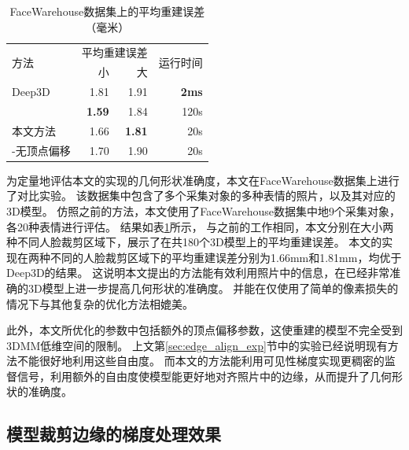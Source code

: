\begin{table}
    \caption[FaceWarehouse数据集上的平均重建误差]{FaceWarehouse数据集上的平均重建误差（毫米）}
    \label{tab:facewarehouse}
    \centering
    \begin{tabular}{l|rrr}
        \toprule
        \multirow{2}{*}{方法} & \multicolumn{2}{c}{平均重建误差} & \multirow{2}{*}{运行时间} \\
        \cmidrule{2-3}
        & 小 & 大 \\
        \midrule
        Deep3D\citep{deep3d} & 1.81 & 1.91 & \textbf{2ms} \\
        \citet{GZCVVPT16} & \textbf{1.59} & 1.84 & 120s \\
        本文方法 & 1.66 & \textbf{1.81} & 20s \\
        \hspace{2ex} -无顶点偏移 & 1.70 & 1.90 & 20s \\
        \bottomrule
    \end{tabular}
\end{table}
为定量地评估本文的实现的几何形状准确度，本文在FaceWarehouse\citep{FaceWarehouse}数据集上进行了对比实验。
该数据集中包含了多个采集对象的多种表情的照片，以及其对应的3D模型。
仿照之前的方法，本文使用了FaceWarehouse数据集中地9个采集对象，各20种表情进行评估。
结果如表\ref{tab:facewarehouse}所示，
与之前的工作相同，本文分别在大小两种不同人脸裁剪区域下，展示了在共180个3D模型上的平均重建误差。
本文的实现在两种不同的人脸裁剪区域下的平均重建误差分别为1.66mm和1.81mm，均优于Deep3D的结果。
这说明本文提出的方法能有效利用照片中的信息，在已经非常准确的3D模型上进一步提高几何形状的准确度。
并能在仅使用了简单的像素损失的情况下与其他复杂的优化方法\citep{GZCVVPT16}相媲美。

此外，本文所优化的参数中包括额外的顶点偏移参数，这使重建的模型不完全受到3DMM低维空间的限制。
上文第\ref{sec:edge_align_exp}节中的实验已经说明现有方法不能很好地利用这些自由度。
而本文的方法能利用可见性梯度实现更稠密的监督信号，利用额外的自由度使模型能更好地对齐照片中的边缘，从而提升了几何形状的准确度。

\subsection{模型裁剪边缘的梯度处理效果}

